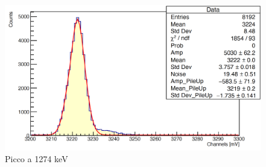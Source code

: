 \documentclass[a4paper,10pt]{article}
\begin{document}
\begin{figure}[H]
    \centering
    \includegraphics[scale=0.45]{appendice/spettri/NaPb2_108}
    \caption{Picco a 1274 keV}
\end{figure}

\end{document}
